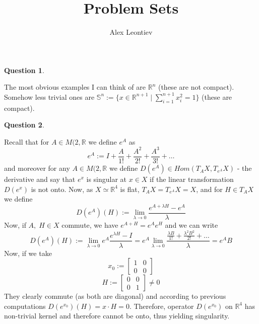 \documentclass[8pt]{article} %
\title{Problem Sets}
\author{Alex Leontiev}
\let\oldlim\lim
\renewcommand{\lim}{\displaystyle\oldlim}
\newtheorem*{prob}{Question}
\begin{document}
\maketitle
\begin{prob}\end{prob}
	The most obvious examples I can think of are $\mathbb{R}^n$ (these are not compact). Somehow less trivial ones are $\mathbb{S}^n:=
	\{x\in\mathbb{R}^{n+1}\mid \sum_{i=1}^{n+1}x_i^2=1\}$ (these are compact).
\begin{prob}\end{prob}%
	Recall that for $A\in M(2,\mathbb{R}$ we define $e^A$ as
	\[e^A:=I+\frac{A}{1!}+\frac{A^2}{2!}+\frac{A^3}{3!}+\dots\]
	and moreover for any $A\in M(2,\mathbb{R}$ we define $D(e^A)\in Hom(T_A X,T_{e^A}X)$ - the derivative and say that $e^x$ is singular
	at $x\in X$ if the linear transformation $D(e^x)$ is not onto. Now, as $X\simeq\mathbb{R}^4$ is flat, $T_A X=T_{e^A}X=X$, and for 
	$H\in T_A X$ we define
	\[D(e^A)(H):=\lim_{\lambda\to 0}\frac{e^{A+\lambda H}-e^A}{\lambda}\]
	Now, if $A,\;H\in X$ commute, we have $e^{A+H}=e^Ae^H$ and we can write
	\[D(e^A)(H):=\lim_{\lambda\to 0}e^A\frac{e^{\lambda H}-I}{\lambda}=e^A\lim_{\lambda\to 0}\frac{\frac{\lambda
	B}{1!}+\frac{\lambda^2B^2}{2!}+\dots}{\lambda}=e^A B\]
	Now, if we take
	\[x_0:=\begin{bmatrix}1&0\\0&0\end{bmatrix}\]
	\[H:=\begin{bmatrix}0&0\\0&1\end{bmatrix}\neq 0\]
		They clearly commute (as both are diagonal) and according to previous computations $D(e^{x_0})(H)=x\cdot H=0$. Therefore,
		operator $D(e^{x_0})$ on $\mathbb{R}^4$ has non-trivial kernel and therefore cannot be onto, thus yielding singularity.
\end{document}

